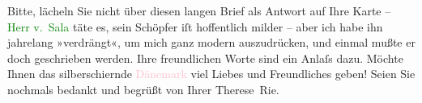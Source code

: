            \pstart
           Bitte, lächeln Sie nicht über diesen langen Brief als Antwort auf Ihre Karte – \textcolor{green}{Herr v. Sala}{} täte es, sein
               Schöpfer iſt hoffentlich milder – aber ich habe ihn jahrelang »verdrängt«, um mich
               ganz modern auszudrücken, und einmal mußte er doch geschrieben werden. Ihre
               freundlichen Worte sind ein Anlaſs dazu. Möchte Ihnen das silberschi{\geminationm}ernde \textcolor{pink}{Dänemark}{}\ledrightnote{\textcolor{pink}{Dänemark}} viel
               Liebes und Freundliches geben! Seien Sie nochmals bedankt und begrüßt von Ihrer\pend
           \pstart \spacefill\mbox{Therese Rie.}\pend{}\endnumbering{}  
      